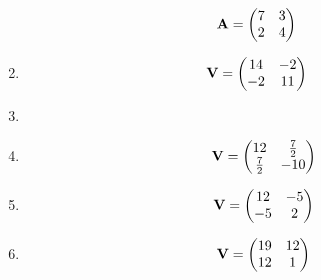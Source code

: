 \documentclass[journal,12pt,twocolumn]{IEEEtran}
\renewcommand\thesection{\arabic{section}}
\begin{document}
\begin{enumerate}[label=\thesection.\arabic*.,ref=\thesection.\theenumi]
\begin{align}
    \mathbf{A} &= \begin{pmatrix} 7 & 3 \\ 2 & 4\end{pmatrix} 
\end{align}
%
%
\item  
\begin{align}
\mathbf{V} &= \begin{pmatrix} 14  & -2 \\ -2 & 11\end{pmatrix}
\end{align}
%
\item 
%
%
%
\item 
	\begin{equation}
	\mathbf{V} = \begin{pmatrix} 12 & \frac{7}{2}\\ \frac{7}{2} & -10\end{pmatrix}
\end{equation}

%
\item   
\begin{equation}
	\mathbf{V} = \begin{pmatrix} 12 & -5\\ -5 & 2\end{pmatrix}
\end{equation}

%
%
\item  
\begin{align}
    \mathbf{V} = \begin{pmatrix} 19 & 12 \\12 & 1\end{pmatrix} \label{eq:solutions/decomp/4/1/42/1.1}
\end{align}


\end{enumerate}
\end{document}
